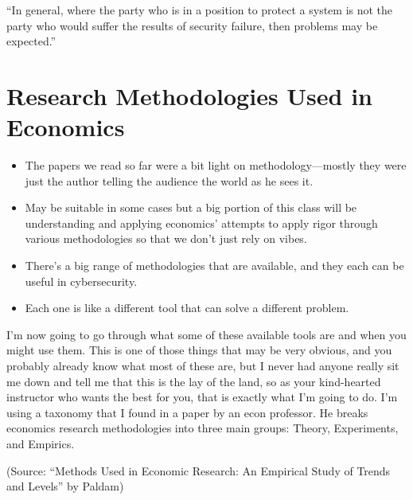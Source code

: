 \documentclass[11pt]{article}
\begin{document}
“In general, where the party who is in a position to protect a system is not the party who would suffer the results of security failure, then problems may be expected.”


\section{Research Methodologies Used in Economics}

\begin{itemize}
    \item The papers we read so far were a bit light on methodology---mostly they were just the author telling the audience the world as he sees it. 
    \item May be suitable in some cases but a big portion of this class will be understanding and applying economics' attempts to apply rigor through various methodologies so that we don't just rely on vibes. 
    \item There's a big range of methodologies that are available, and they each can be useful in cybersecurity. 
    \item Each one is like a different tool that can solve a different problem.
\end{itemize}


I'm now going to go through what some of these available tools are and when you might use them.
This is one of those things that may be very obvious, and you probably already know what most of these are, but I never had anyone really sit me down and tell me that this is the lay of the land, so as your kind-hearted instructor who wants the best for you, that is exactly what I'm going to do. I'm using a taxonomy that I found in a paper by an econ professor. He breaks economics research methodologies into three main groups: Theory, Experiments, and Empirics.

(Source: ``Methods Used in Economic Research: An Empirical Study of Trends and Levels'' by Paldam)
\end{document}
